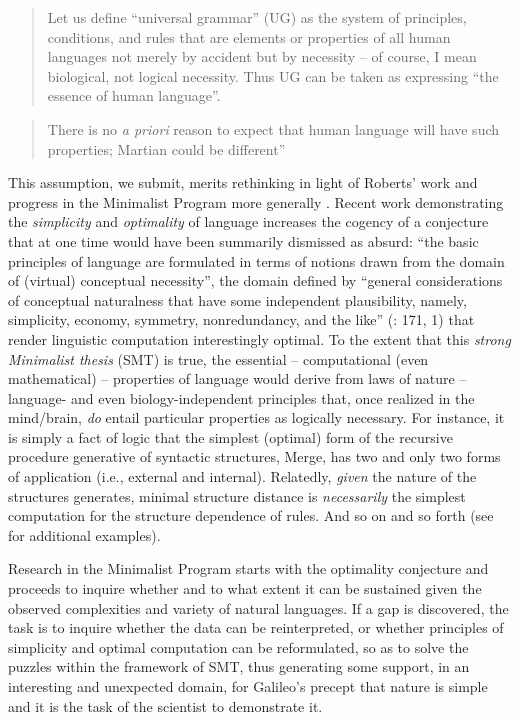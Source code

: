 \documentclass[output=paper]{langsci/langscibook}
\begin{document}
\begin{quote}Let us define ``universal grammar'' (\gls{UG}) as the system of
principles, conditions, and rules that are elements or properties of all human
languages not merely by accident but by necessity – of course, I mean
biological, not logical necessity. Thus \gls{UG} can be taken as expressing
\enquote{the essence of human language}. \citep[29]{Chomsky1975}
\end{quote}

\begin{quote}There is no \emph{a priori} reason to expect that human language will
have such properties; Martian could be different” \citep[16]{Chomsky2000}
\end{quote}

This assumption, we submit, merits rethinking in light of Roberts’ work and
progress in the Minimalist Program more generally \citep{Chomsky1995}. Recent
work demonstrating the \emph{simplicity} \parencite{WatChoRob2017} and
\emph{optimality} \citep{ChoGalOtt2019} of language increases the cogency of
a conjecture that at one time would have been summarily dismissed as absurd:
“the basic principles of language are formulated in terms of notions drawn from
the domain of (virtual) conceptual necessity”, the domain defined by “general
considerations of conceptual naturalness that have some independent
plausibility, namely, simplicity, economy, symmetry, nonredundancy, and the
like” (\citealt{Chomsky1995}: 171, 1) that render linguistic computation
interestingly optimal. To the extent that this \emph{strong Minimalist thesis} 
(\gls{SMT}) is true,
the essential – computational (even mathematical) – properties of language
would derive from laws of nature – language- and even biology-independent
principles that, once realized in the mind/brain, \emph{do} entail particular
properties as logically necessary. For instance, it is simply a fact of logic
that the simplest (optimal) form of the recursive procedure generative of
syntactic structures, Merge, has two and only two forms of application (i.e.,
external and internal).  Relatedly, \emph{given} the nature of the structures
 generates, minimal structure distance is \emph{necessarily} the
simplest computation for the structure dependence of rules. And so on and so
forth (see \citealt{BerwickEtAl2011,Chomsky2013,Watumull2015} for additional
examples).

Research in the Minimalist Program starts with the optimality conjecture and
proceeds to inquire whether and to what extent it can be sustained given the
observed complexities and variety of natural languages. If a gap is discovered,
the task is to inquire whether the data can be reinterpreted, or whether
principles of simplicity and optimal computation can be reformulated, so as to
solve the puzzles within the framework of \gls{SMT}, thus generating some support, in
an interesting and unexpected domain, for Galileo’s precept that nature is
simple and it is the task of the scientist to demonstrate it.
\end{document}
